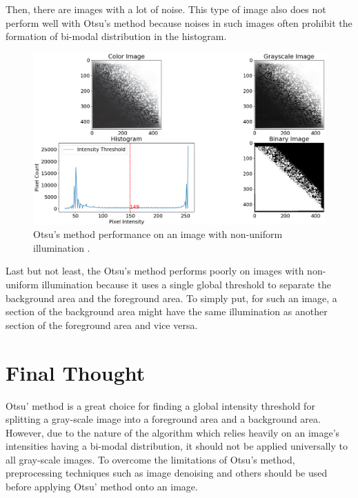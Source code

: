 \documentclass[conference]{IEEEtran}
\begin{document}
Then, there are images with a lot of noise. This type of image also does not perform well with Otsu's method because noises in such images often prohibit the formation of bi-modal distribution in the histogram.
\begin{figure}[!htb]
    \centering
    \includegraphics[width=\linewidth]{non-uniform illumination_image.png}
    \caption{Otsu's method performance on an image with non-uniform illumination \cite{bird:2014}.}
\end{figure}
Last but not least, the Otsu's method performs poorly on images with non-uniform illumination because it uses a single global threshold to separate the background area and the foreground area. To simply put, for such an image, a section of the background area might have the same illumination as another section of the foreground area and vice versa.

\section{Final Thought}
Otsu' method is a great choice for finding a global intensity threshold for splitting a gray-scale image into a foreground area and a background area. However, due to the nature of the algorithm which relies heavily on an image's intensities having a bi-modal distribution, it should not be applied universally to all gray-scale images. To overcome the limitations of Otsu's method, preprocessing techniques such as image denoising and others should be used before applying Otsu' method onto an image.

\printbibliography
\end{document}

